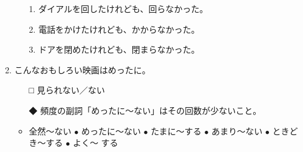 \documentclass[
uplatex,
b5paper,
10pt,
dvipdfmx
]{jsbook}
\begin{document}
\begin{enumerate}
\begin{itemize}
\item[1.] ダイアルを回したけれども、回らなかった。
\item[2.] 電話をかけたけれども、かからなかった。
\item[3.] ドアを閉めたけれども、閉まらなかった。
\end{itemize}

\item こんなおもしろい映画はめったに\underline{\hspace{3zw}}。
\begin{itemize}
\item[□] 見られない／ない
\item[◆] 頻度の副詞「めったに〜ない」はその回数が少ないこと。
\end{itemize}
\begin{itemize}
 \item 全然〜ない $\bullet$ めったに〜ない $\bullet$ たまに〜する 
       $\bullet$ あまり〜ない $\bullet$ ときどき〜する $\bullet$ よく〜
       する
\end{itemize}
\end{enumerate}

\end{document}
